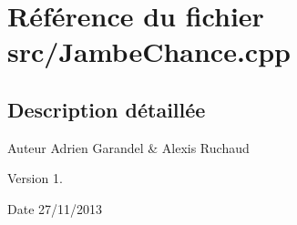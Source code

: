 \section{Référence du fichier src/\-Jambe\-Chance.cpp}
\label{_jambe_chance_8cpp}


\subsection{Description détaillée}
\begin{DoxyAuthor}{Auteur}
Adrien Garandel \& Alexis Ruchaud 
\end{DoxyAuthor}
\begin{DoxyVersion}{Version}
1. 
\end{DoxyVersion}
\begin{DoxyDate}{Date}
27/11/2013 
\end{DoxyDate}
